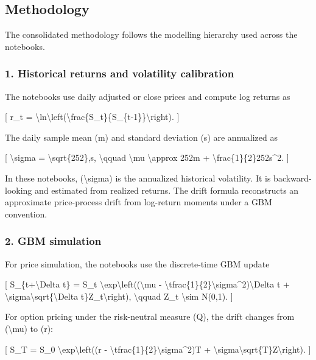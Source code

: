 \documentclass[
  11pt,
]{article}
\begin{document}
\subsection{Methodology}\label{methodology}

The consolidated methodology follows the modelling hierarchy used across the notebooks.

\subsubsection{1. Historical returns and volatility calibration}\label{1-historical-returns-and-volatility-calibration}

The notebooks use daily adjusted or close prices and compute log returns as

{[} r\_t = \textbackslash ln\textbackslash left(\textbackslash frac\{S\_t\}\{S\_\{t-1\}\}\textbackslash right). {]}

The daily sample mean (m) and standard deviation (s) are annualized as

{[} \textbackslash sigma = \textbackslash sqrt\{252\},s, \textbackslash qquad \textbackslash mu \textbackslash approx 252m + \textbackslash frac\{1\}\{2\}252s\^{}2. {]}

In these notebooks, (\textbackslash sigma) is the annualized historical volatility. It is backward-looking and estimated from realized returns. The drift formula reconstructs an approximate price-process drift from log-return moments under a GBM convention.

\subsubsection{2. GBM simulation}\label{2-gbm-simulation}

For price simulation, the notebooks use the discrete-time GBM update

{[} S\_\{t+\textbackslash Delta t\} = S\_t \textbackslash exp\textbackslash left((\textbackslash mu - \textbackslash tfrac\{1\}\{2\}\textbackslash sigma\^{}2)\textbackslash Delta t + \textbackslash sigma\textbackslash sqrt\{\textbackslash Delta t\}Z\_t\textbackslash right), \textbackslash qquad Z\_t \textbackslash sim N(0,1). {]}

For option pricing under the risk-neutral measure (Q), the drift changes from (\textbackslash mu) to (r):

{[} S\_T = S\_0 \textbackslash exp\textbackslash left((r - \textbackslash tfrac\{1\}\{2\}\textbackslash sigma\^{}2)T + \textbackslash sigma\textbackslash sqrt\{T\}Z\textbackslash right). {]}
\end{document}
